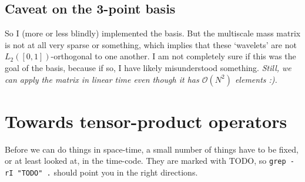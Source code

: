 \documentclass[11pt,a4paper]{amsart}
\theoremstyle{definition}
\begin{document}
\subsection{Caveat on the 3-point basis}
So I (more or less blindly) implemented the basis. But the multiscale mass matrix
is not at all very sparse or something, which implies that these `wavelets' are
not $L_2([0,1])$-orthogonal to one another. I am not completely sure if this was
the goal of the basis, because if so, I have likely misunderstood something.
\emph{Still, we can apply the matrix in linear time even though it has $\mathcal O(N^2)$
elements :).}

\section{Towards tensor-product operators}
Before we can do things in space-time, a small number of things have to be fixed,
or at least looked at, in the time-code. They are marked with TODO, so
\texttt{grep -rI "TODO" .} should point you in the right directions.
\end{document}
